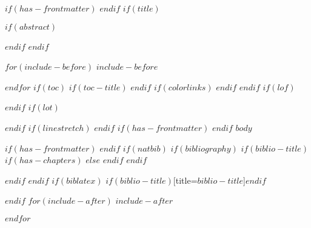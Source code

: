 \documentclass[
  11pt, %
  a4paper, %
]{article} %
\begin{document}
$if(has-frontmatter)$
\frontmatter
$endif$
$if(title)$
\maketitle
$if(abstract)$
\begin{abstract}
$abstract$
\end{abstract}
$endif$
$endif$

$for(include-before)$
$include-before$

$endfor$
$if(toc)$
$if(toc-title)$
\renewcommand*\contentsname{$toc-title$}
$endif$
{
$if(colorlinks)$
\hypersetup{linkcolor=$if(toccolor)$$toccolor$$else$$endif$}
$endif$
\setcounter{tocdepth}{$toc-depth$}
\renewcommand{\contentsname}{Inhaltsverzeichnis}
\tableofcontents
\newpage
}
$endif$
$if(lof)$
\listoffigures
$endif$
$if(lot)$
\listoftables
$endif$
$if(linestretch)$
$endif$
$if(has-frontmatter)$
\mainmatter
$endif$
$body$

$if(has-frontmatter)$
\backmatter
$endif$
$if(natbib)$
$if(bibliography)$
$if(biblio-title)$
$if(has-chapters)$
\renewcommand\bibname{$biblio-title$}
$else$
\renewcommand\refname{$biblio-title$}
$endif$
$endif$


$endif$
$endif$
$if(biblatex)$
\printbibliography$if(biblio-title)$[title=$biblio-title$]$endif$

$endif$
$for(include-after)$
$include-after$

$endfor$
\end{document}
